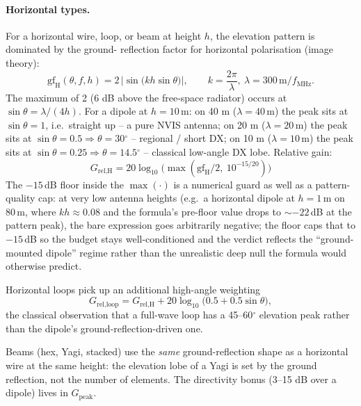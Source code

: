 \documentclass[11pt,a4paper]{article}
\newcommand{\SI}[2]{#1\,\text{#2}}
\newcommand{\degree}{\ensuremath{{}^\circ}}
\begin{document}
\paragraph{Horizontal types.}  For a horizontal wire, loop, or beam
at height $h$, the elevation pattern is dominated by the ground-
reflection factor for horizontal polarisation (image theory):
\begin{equation}\label{eq:gfh}
  \text{gf}_{\text{H}}(\theta, f, h) =
    2\,\bigl|\sin\!\bigl(k h \sin\theta\bigr)\bigr|,
  \qquad k = \frac{2\pi}{\lambda},\ \lambda = \SI{300}{m}/f_{\text{MHz}}.
\end{equation}
The maximum of 2 (6 dB above the free-space radiator) occurs at
$\sin\theta = \lambda/(4h)$.  For a dipole at $h = \SI{10}{m}$:
on 40 m ($\lambda = \SI{40}{m}$) the peak sits at
$\sin\theta = 1$, i.e.\ straight up -- a pure NVIS antenna;
on 20 m ($\lambda = \SI{20}{m}$) the peak sits at
$\sin\theta = 0.5 \Rightarrow \theta = 30\degree$ -- regional / short
DX; on 10 m ($\lambda = \SI{10}{m}$) the peak sits at
$\sin\theta = 0.25 \Rightarrow \theta = 14.5\degree$ -- classical
low-angle DX lobe.  Relative gain:
\begin{equation}
  G_{\text{rel,H}} = 20\log_{10}\!\bigl(\max(\text{gf}_{\text{H}}/2,\ 10^{-15/20})\bigr)
\end{equation}
The $-15$\,dB floor inside the $\max(\cdot)$ is a numerical guard
as well as a pattern-quality cap: at very low antenna heights
(e.g.\ a horizontal dipole at $h = \SI{1}{m}$ on 80\,m, where
$kh \approx 0.08$ and the formula's pre-floor value drops to
${\sim}-22$\,dB at the pattern peak), the bare expression goes
arbitrarily negative; the floor caps that to $-15$\,dB so the
budget stays well-conditioned and the verdict reflects the
``ground-mounted dipole'' regime rather than the unrealistic
deep null the formula would otherwise predict.

Horizontal loops pick up an additional high-angle weighting
\begin{equation}\label{eq:loophiangle}
  G_{\text{rel,loop}} = G_{\text{rel,H}} +
    20\log_{10}\!\bigl(0.5 + 0.5\sin\theta\bigr),
\end{equation}
the classical observation that a full-wave loop has a
45--60\degree{} elevation peak rather than the dipole's
ground-reflection-driven one.

Beams (hex, Yagi, stacked) use the \emph{same} ground-reflection
shape as a horizontal wire at the same height: the elevation lobe
of a Yagi is set by the ground reflection, not the number of
elements.  The directivity bonus (3--15 dB over a dipole) lives in
$G_{\text{peak}}$.
\end{document}

